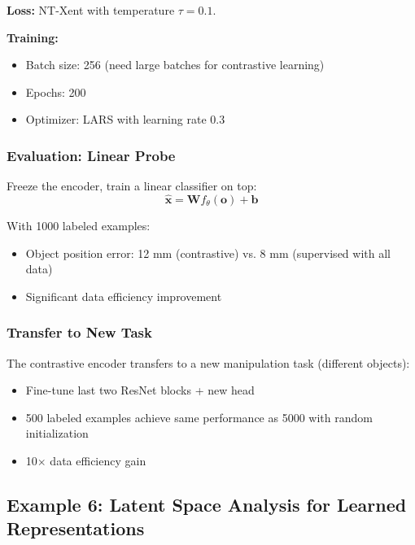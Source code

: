 \textbf{Loss:} NT-Xent with temperature $\tau = 0.1$.

\textbf{Training:}
\begin{itemize}
    \item Batch size: 256 (need large batches for contrastive learning)
    \item Epochs: 200
    \item Optimizer: LARS with learning rate 0.3
\end{itemize}

\subsubsection{Evaluation: Linear Probe}

Freeze the encoder, train a linear classifier on top:
\begin{equation}
\hat{\mathbf{x}} = \mathbf{W} f_\theta(\mathbf{o}) + \mathbf{b}
\label{eq:linear_probe}
\end{equation}

With 1000 labeled examples:
\begin{itemize}
    \item Object position error: 12 mm (contrastive) vs. 8 mm (supervised with all data)
    \item Significant data efficiency improvement
\end{itemize}

\subsubsection{Transfer to New Task}

The contrastive encoder transfers to a new manipulation task (different objects):
\begin{itemize}
    \item Fine-tune last two ResNet blocks + new head
    \item 500 labeled examples achieve same performance as 5000 with random initialization
    \item 10$\times$ data efficiency gain
\end{itemize}


\subsection{Example 6: Latent Space Analysis for Learned Representations}

